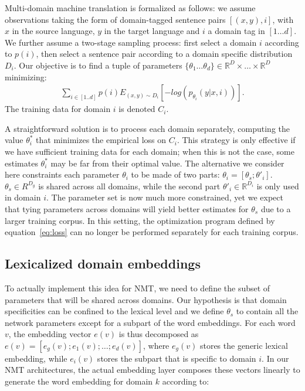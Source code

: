 Multi-domain machine translation is formalized as follows: we assume observations taking the form of  domain-tagged sentence pairs $[(x,y),i]$, with $x$ in the source language, $y$ in the target language and $i$ a domain tag in $[1\dots d]$. We further assume a two-stage sampling process: first select a domain $i$ according to $p(i)$, then select a sentence pair according to a domain specific distribution $D_i$. Our objective is to find a tuple of parameters $\{\theta_1 \dots \theta_d \} \in \mathbb{R}^D \times \dots \times \mathbb{R}^D$ minimizing:
\begin{equation} \label{eq:loss}
\begin{split}
\sum_{i \in [1..d]} p(i) E_{(x,y) \sim D_{i}} [-log(p_{\theta_i}(y|x,i))] \text{.}
\end{split}
\end{equation}
The training data for domain $i$ is denoted $C_i$.

A straightforward solution is to process each domain separately, computing the value $\theta_i^*$ that minimizes the empirical loss on $C_i$. This strategy is only effective if we have sufficient training data for each domain; when this is not the case, some estimates $\theta_i^*$ may be far from their optimal value. 
The alternative we consider here constraints each parameter $\theta_i$ to be made of two parts: $\theta_i = [\theta_s; \theta'_i]$. $\theta_s \in R^{D_g}$ is shared across all domains, while the second part $\theta'_i \in \mathbb{R}^{D_i}$ is only used in domain $i$.
The parameter set is now much more constrained, yet we expect that tying parameters across domains will yield better estimates for $\theta_s$ due to a larger training corpus. In this setting, the optimization program defined by equation~\eqref{eq:loss} can no longer be performed separately for each training corpus.

\subsection{Lexicalized domain embeddings \label{ssec:lde}}

To actually implement this idea for NMT, we need to define the subset of parameters that will be shared across domains. 
Our hypothesis is that domain specificities can be confined to the lexical level and we define $\theta_s$ to contain all the network parameters except for a subpart of the word embeddings. 
For each word $v$, the embedding vector $e(v)$ is thus decomposed as $e(v) = [e_g(v); e_1(v); \dots; e_d(v)]$, where $e_g(v)$ stores the generic lexical embedding, while $e_i(v)$ stores the subpart that is specific to domain $i$.
In our NMT architectures, the actual embedding layer composes these vectors linearly to generate the word embedding for domain $k$ according to:

